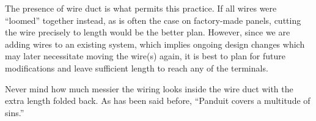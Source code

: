





The presence of wire duct is what permits this practice.  If all wires were ``loomed'' together instead, as is often the case on factory-made panels, cutting the wire precisely to length would be the better plan.  However, since we are adding wires to an existing system, which implies ongoing design changes which may later necessitate moving the wire(s) again, it is best to plan for future modifications and leave sufficient length to reach any of the terminals.

Never mind how much messier the wiring looks inside the wire duct with the extra length folded back.  As has been said before, ``Panduit covers a multitude of sins.''




